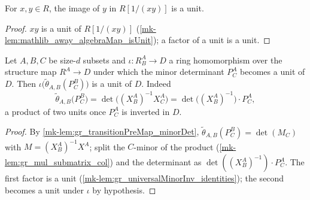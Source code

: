 \begin{lemma}\label{mk-lem:gr_isUnit_algebraMap_away_right}
  \leanok

  For \(x, y \in R\), the image of \(y\) in \(R[1/(xy)]\) is a unit.
\end{lemma}
\begin{proof}
  \leanok

\(xy\) is a unit of \(R[1/(xy)]\)
  (\ref{mk-lem:mathlib_away_algebraMap_isUnit}); a factor of a unit is a unit.

\end{proof}

\begin{lemma}\label{mk-lem:gr_isUnit_incl_transitionPreMap_cross}
  \leanok

  Let \(A, B, C\) be size-\(d\) subsets and \(\iota : R^A_B \to D\) a ring
  homomorphism over the structure map \(R^A \to D\) under which the minor
  determinant \(P^A_C\) becomes a unit of \(D\). Then
  \(\iota\bigl(\tilde\theta_{A,B}(P^B_C)\bigr)\) is a unit of \(D\). Indeed
  \[
    \tilde\theta_{A,B}\bigl(P^B_C\bigr)
      = \det\bigl((X^A_B)^{-1} X^A_C\bigr)
      = \det\bigl((X^A_B)^{-1}\bigr)\cdot P^A_C ,
  \]
  a product of two units once \(P^A_C\) is inverted in \(D\).
\end{lemma}
\begin{proof}
  \leanok

By \ref{mk-lem:gr_transitionPreMap_minorDet},
  \(\tilde\theta_{A,B}(P^B_C) = \det(M_C)\) with \(M = (X^A_B)^{-1} X^A\); split
  the \(C\)-minor of the product (\ref{mk-lem:gr_mul_submatrix_col}) and the
  determinant as \(\det((X^A_B)^{-1}) \cdot P^A_C\). The first factor is a unit
  (\ref{mk-lem:gr_universalMinorInv_identities}); the second becomes a unit under
  \(\iota\) by hypothesis.
\end{proof}

